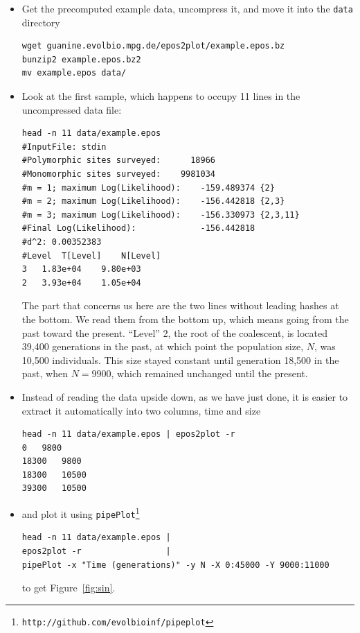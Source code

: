 \documentclass[a4paper]{article}
\newcommand{\ty}{\texttt}
\begin{document}
\begin{itemize}
\item Get the precomputed example data, uncompress it, and move it into the
  \texttt{data} directory
\begin{verbatim}
wget guanine.evolbio.mpg.de/epos2plot/example.epos.bz
bunzip2 example.epos.bz2 
mv example.epos data/
\end{verbatim}
\item Look at the first sample, which happens to occupy 11 lines in
  the uncompressed data file:
\begin{verbatim}
head -n 11 data/example.epos 
#InputFile: stdin
#Polymorphic sites surveyed:      18966
#Monomorphic sites surveyed:    9981034
#m = 1; maximum Log(Likelihood):    -159.489374 {2}
#m = 2; maximum Log(Likelihood):    -156.442818 {2,3}
#m = 3; maximum Log(Likelihood):    -156.330973 {2,3,11}
#Final Log(Likelihood):             -156.442818
#d^2: 0.00352383
#Level	T[Level]	N[Level]
3	1.83e+04	9.80e+03
2	3.93e+04	1.05e+04
\end{verbatim}
The part that concerns us here are the two lines without
leading hashes at the bottom. We read them from the bottom up, which means going
from the past toward the present. ``Level'' 2, the root of the
coalescent, is located 39,400 generations in the past, at
which point the population size, $N$, was 10,500 individuals. This
size stayed constant until generation 18,500 in the past,
when $N=9900$, which remained unchanged until the present.

\item Instead of reading the data upside down, as we have just done,
  it is easier to extract it automatically into two columns, time and size
\begin{verbatim}
head -n 11 data/example.epos | epos2plot -r
0	9800
18300	9800
18300	10500
39300	10500
\end{verbatim}
\item and plot it using \ty{pipePlot}\footnote{\ty{http://github.com/evolbioinf/pipeplot}}
\begin{verbatim}
head -n 11 data/example.epos | 
epos2plot -r                 | 
pipePlot -x "Time (generations)" -y N -X 0:45000 -Y 9000:11000
\end{verbatim}
to get Figure~\ref{fig:sin}.


\end{itemize}
\end{document}
